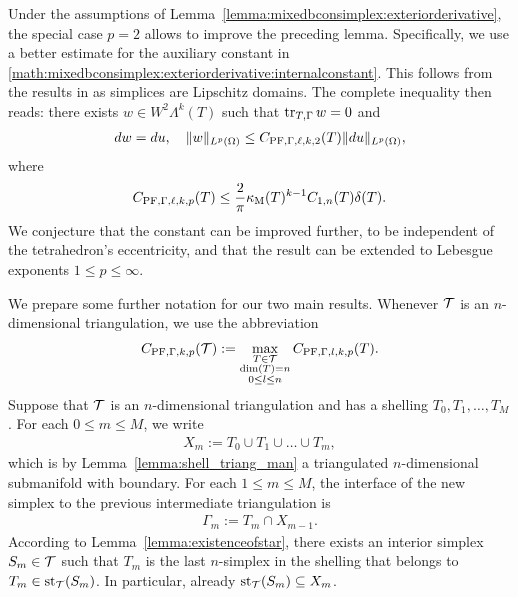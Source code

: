 \documentclass[10pt,a4paper]{article}
\begin{document}
\begin{remark}\label{remark:mixedbconsimplex:exteriorderivative:hilbert}
    Under the assumptions of Lemma~\ref{lemma:mixedbconsimplex:exteriorderivative}, 
    the special case $p=2$ allows to improve the preceding lemma.
    Specifically, we use a better estimate for the auxiliary constant in \eqref{math:mixedbconsimplex:exteriorderivative:internalconstant}.
    This follows from the results in \cite{licht2024geometry} as simplices are Lipschitz domains.
    The complete inequality then reads: 
    there exists $w \in W^{2}\Lambda^{k}(T)$ such that 
    $\operatorname{tr}_{T,\Gamma} w = 0$
    and  
    \begin{align*}
        d w = d u,
        \quad 
        \| w \|_{L^{p}(\Omega)} 
        \leq 
        C_{{\rm PF},\Gamma,\ell,k,2}(T)
        \| d u \|_{L^{p}(\Omega)}
        ,
    \end{align*}
    where 
    \begin{align*}
        C_{{\rm PF},\Gamma,\ell,k,p}(T)
        \leq 
        \frac{2}{\pi}
        \kappa_{\rm M}(T)^{k-1}
        C_{1,n}(T) 
        {\delta}(T)
        .
    \end{align*}
    We conjecture that the constant can be improved further, to be independent of the tetrahedron's eccentricity,
    and that the result can be extended to Lebesgue exponents $1 \leq p \leq \infty$.
\end{remark}





We prepare some further notation for our two main results. 
Whenever ${\mathcal T}$ is an $n$-dimensional triangulation, we use the abbreviation
\begin{align*}
    C_{{\rm PF},\Gamma,k,p}({\mathcal T}) 
    :=
    \max\limits_{ \substack{ T \in {\mathcal T} \\ \dim(T)=n \\ 0 \leq l \leq n } }
    C_{{\rm PF},\Gamma,l,k,p}(T)
    .
\end{align*}
Suppose that ${\mathcal T}$ is an $n$-dimensional triangulation and has a shelling $T_{0}, T_{1}, \dots, T_{M}$. 
For each $0 \leq m \leq M$, we write 
\begin{align*}
    X_{m} := T_0 \cup T_1 \cup \dots \cup T_{m},
\end{align*}
which is by Lemma~\ref{lemma:shell_triang_man} a triangulated $n$-dimensional submanifold with boundary. 
For each $1 \leq m \leq M$, the interface of the new simplex to the previous intermediate triangulation is 
\begin{align*}
    \Gamma_{m} := T_{m} \cap X_{m-1} %
    .
\end{align*}
According to Lemma~\ref{lemma:existenceofstar}, 
there exists an interior simplex $S_{m} \in {\mathcal T}$ 
such that $T_{m}$ is the last $n$-simplex in the shelling that belongs to $T_{m} \in \operatorname{st}_{{\mathcal T}}(S_{m})$.
In particular, already $\operatorname{st}_{{\mathcal T}}(S_{m}) \subseteq X_{m}$. %
\end{document}
